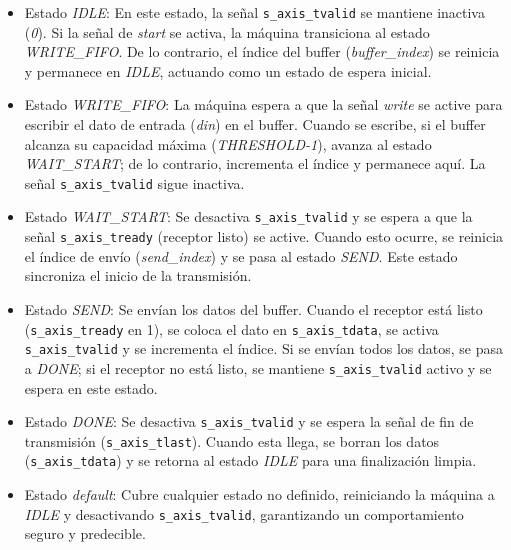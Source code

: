 \begin{itemize}
    \item Estado \emph{IDLE}: En este estado, la señal \texttt{s\_axis\_tvalid} se mantiene inactiva (\emph{0}). Si la señal de \emph{start} se activa, la máquina transiciona al estado \emph{WRITE\_FIFO}. De lo contrario, el índice del buffer (\emph{buffer\_index}) se reinicia y permanece en \emph{IDLE}, actuando como un estado de espera inicial.
    \item Estado \emph{WRITE\_FIFO}: La máquina espera a que la señal \emph{write} se active para escribir el dato de entrada (\emph{din}) en el buffer. Cuando se escribe, si el buffer alcanza su capacidad máxima (\emph{THRESHOLD-1}), avanza al estado \emph{WAIT\_START}; de lo contrario, incrementa el índice y permanece aquí. La señal \texttt{s\_axis\_tvalid} sigue inactiva.
    \item Estado \emph{WAIT\_START}: Se desactiva \texttt{s\_axis\_tvalid} y se espera a que la señal \texttt{s\_axis\_tready} (receptor listo) se active. Cuando esto ocurre, se reinicia el índice de envío (\emph{send\_index}) y se pasa al estado \emph{SEND}. Este estado sincroniza el inicio de la transmisión.
    \item Estado \emph{SEND}: Se envían los datos del buffer. Cuando el receptor está listo (\texttt{s\_axis\_tready} en 1), se coloca el dato en \texttt{s\_axis\_tdata}, se activa \texttt{s\_axis\_tvalid} y se incrementa el índice. Si se envían todos los datos, se pasa a \emph{DONE}; si el receptor no está listo, se mantiene \texttt{s\_axis\_tvalid} activo y se espera en este estado.
    \item Estado \emph{DONE}: Se desactiva \texttt{s\_axis\_tvalid} y se espera la señal de fin de transmisión (\texttt{s\_axis\_tlast}). Cuando esta llega, se borran los datos (\texttt{s\_axis\_tdata}) y se retorna al estado \emph{IDLE} para una finalización limpia.
    \item Estado \emph{default}: Cubre cualquier estado no definido, reiniciando la máquina a \emph{IDLE} y desactivando \texttt{s\_axis\_tvalid}, garantizando un comportamiento seguro y predecible.
\end{itemize}

